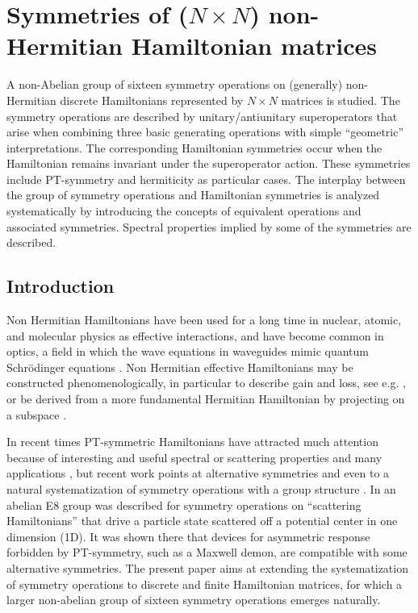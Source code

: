 
\chapter{Symmetries of ($N\times N$) non-Hermitian Hamiltonian matrices}
\label{ChapterNNSymmetries}
%
A non-Abelian group of sixteen symmetry operations on (generally) \linebreak non-Hermitian
discrete Hamiltonians represented by $N\times N$ matrices is studied. The symmetry operations are described by unitary/antiunitary superoperators that arise  when combining
three basic generating operations with simple ``geometric'' interpretations. The corresponding Hamiltonian symmetries occur when
the Hamiltonian remains invariant under the superoperator action. These symmetries  include PT-symmetry and hermiticity as particular cases.
The interplay between the group of symmetry operations and Hamiltonian symmetries
is analyzed systematically by introducing the concepts of equivalent operations and associated symmetries.
Spectral properties implied by some of the symmetries are described.
%
\newpage
%
\section{Introduction}
%
Non Hermitian Hamiltonians have been used for a long time in nuclear, atomic, and molecular physics
as effective interactions, and have become common in optics, a field in which the wave equations in waveguides mimic  quantum Schr\"odinger equations \cite{Ruschhaupt2005,Longhi2017a,Konotop2016}.
%
Non Hermitian effective Hamiltonians may be constructed phenomenologically, in particular  to describe gain and loss, see e.g.
\cite{Ruschhaupt2005},
or be derived from a more fundamental Hermitian Hamiltonian
by projecting on a subspace \cite{Feshbach1958,Ruschhaupt2004a,Muga2004}.
%

In recent times PT-symmetric Hamiltonians \cite{Bender1998} have attracted much attention because of interesting and useful
spectral or scattering properties and many applications \cite{Longhi2017a,Konotop2016}, but recent work points at alternative symmetries \cite{Nixon2016,Nixon2016a,Chen2017,Ruschhaupt2017,Simon2018,Simon2019a} and even to a natural systematization of symmetry operations with a group structure  \cite{Ruschhaupt2017}. In \cite{Simon2019a} an abelian E8 group was described for symmetry operations on  ``scattering Hamiltonians''
that drive a particle state scattered off a potential center in one dimension (1D). It was shown there that devices for asymmetric response
forbidden by PT-symmetry, such as a  Maxwell demon,  are  compatible with some alternative symmetries. The present paper aims at extending the systematization
of symmetry operations to discrete and finite Hamiltonian matrices, for which a larger non-abelian group
of sixteen symmetry operations emerges naturally.

